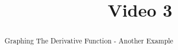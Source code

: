 \documentclass[handout]{ximera}
\title{Video 3}
\begin{document}
\begin{abstract}
Graphing The Derivative Function - Another Example
\end{abstract}

\maketitle

\end{document}
